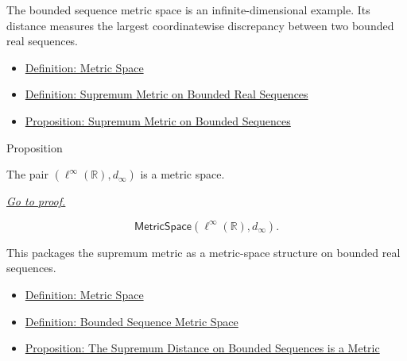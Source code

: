 \begin{remark*}[Interpretation]
The bounded sequence metric space is an infinite-dimensional example.  Its
distance measures the largest coordinatewise discrepancy between two bounded
real sequences.
\end{remark*}

\begin{dependencies}
\begin{itemize}
  \item \hyperref[def:metric-space]{Definition: Metric Space}
  \item \hyperref[def:bounded-real-sequence-space]{Definition: Supremum Metric on Bounded Real Sequences}
  \item \hyperref[prop:bounded-real-sequence-space-sup-metric]{Proposition: Supremum Metric on Bounded Sequences}
\end{itemize}
\end{dependencies}

\begin{propositionbox}{Proposition}
\begin{proposition}
\label{prop:bounded-sequence-metric-space}
The pair \((\ell^\infty(\mathbb{R}),d_\infty)\) is a metric space.

\smallskip
\noindent
\hyperref[prf:bounded-sequence-metric-space]{\textit{Go to proof.}}
\end{proposition}
\end{propositionbox}

\begin{remark*}
\[
  \mathsf{MetricSpace}(\ell^\infty(\mathbb{R}),d_\infty).
\]
\end{remark*}

\begin{remark*}[Interpretation]
This packages the supremum metric as a metric-space structure on bounded real sequences.
\end{remark*}

\begin{dependencies}
\begin{itemize}
  \item \hyperref[def:metric-space]{Definition: Metric Space}
  \item \hyperref[def:bounded-sequence-metric-space]{Definition: Bounded Sequence Metric Space}
  \item \hyperref[prop:bounded-real-sequence-space-sup-metric]{Proposition: The Supremum Distance on Bounded Sequences is a Metric}
\end{itemize}
\end{dependencies}

